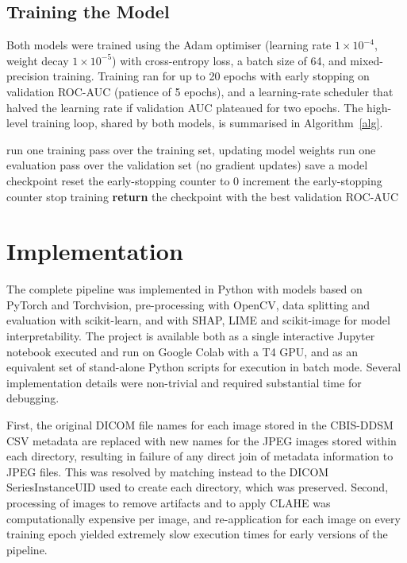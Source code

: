 \subsection{Training the Model}
Both models were trained using the Adam optimiser (learning rate $1\times10^{-4}$, weight decay $1\times10^{-5}$) with cross-entropy loss, a batch size of 64, and mixed-precision training. Training ran for up to 20 epochs with early stopping on validation ROC-AUC (patience of 5 epochs), and a learning-rate scheduler that halved the learning rate if validation AUC plateaued for two epochs. The high-level training loop, shared by both models, is summarised in Algorithm~\ref{alg}.

\begin{algorithm}[t]
    \begin{algorithmic}
            \STATE run one training pass over the training set, updating model weights
            \STATE run one evaluation pass over the validation set (no gradient updates)
                \STATE save a model checkpoint
                \STATE reset the early-stopping counter to 0
            \ELSE
                \STATE increment the early-stopping counter
            \ENDIF
                \STATE stop training
            \ENDIF
        \ENDFOR
        \STATE \textbf{return} the checkpoint with the best validation ROC-AUC
    \end{algorithmic}
\caption{Training loop with early stopping (used for both models).}
\label{alg}
\end{algorithm}

\section{Implementation}
The complete pipeline was implemented in Python with models based on PyTorch and Torchvision, pre-processing with OpenCV, data splitting and evaluation with scikit-learn, and with SHAP, LIME and scikit-image for model interpretability. The project is available both as a single interactive Jupyter notebook executed and run on Google Colab with a T4 GPU, and as an equivalent set of stand-alone Python scripts for execution in batch mode. Several implementation details were non-trivial and required substantial time for debugging.

First, the original DICOM file names for each image stored in the CBIS-DDSM CSV metadata are replaced with new names for the JPEG images stored within each directory, resulting in failure of any direct join of metadata information to JPEG files. This was resolved by matching instead to the DICOM SeriesInstanceUID used to create each directory, which was preserved. Second, processing of images to remove artifacts and to apply CLAHE was computationally expensive per image, and re-application for each image on every training epoch yielded extremely slow execution times for early versions of the pipeline.

